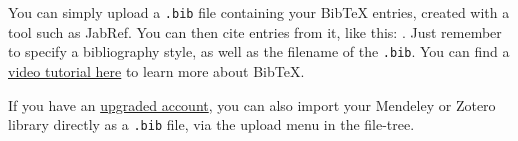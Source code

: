 \documentclass{article}
\begin{document}
You can simply upload a \verb|.bib| file containing your BibTeX entries, created with a tool such as JabRef. You can then cite entries from it, like this: \cite{greenwade93}. Just remember to specify a bibliography style, as well as the filename of the \verb|.bib|. You can find a \href{https://www.overleaf.com/help/97-how-to-include-a-bibliography-using-bibtex}{video tutorial here} to learn more about BibTeX.

If you have an \href{https://www.overleaf.com/user/subscription/plans}{upgraded account}, you can also import your Mendeley or Zotero library directly as a \verb|.bib| file, via the upload menu in the file-tree.

\newpage



\end{document}
